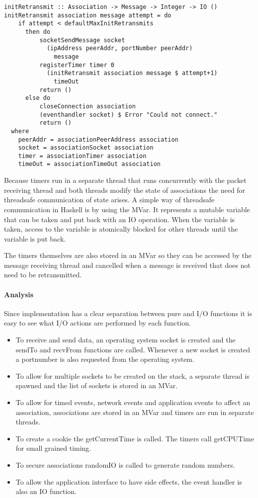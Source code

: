 \begin{lstlisting}[caption={The init retransmission function}, label={lst-retransmission}]
initRetransmit :: Association -> Message -> Integer -> IO ()
initRetransmit association message attempt = do
    if attempt < defaultMaxInitRetransmits
      then do
          socketSendMessage socket 
            (ipAddress peerAddr, portNumber peerAddr)
              message
          registerTimer timer 0
            (initRetransmit association message $ attempt+1)
              timeOut
          return ()
      else do
          closeConnection association
          (eventhandler socket) $ Error "Could not connect."
          return ()
  where
    peerAddr = associationPeerAddress association
    socket = associationSocket association
    timer = associationTimer association
    timeOut = associationTimeOut association
\end{lstlisting}
Because timers run in a separate thread that runs concurrently with the packet receiving thread and both threads modify the state of associations the need for threadsafe communication of state arises. 
A simple way of threadsafe communication in Haskell is by using the MVar.
It represents a mutable variable that can be taken and put back with an IO operation.
When the variable is taken, access to the variable is atomically blocked for other threads until the variable is put back. 

The timers themselves are also stored in an MVar so they can be accessed by the message receiving thread and cancelled when a message is received that does not need to be retransmitted.

\paragraph{Analysis}
Since implementation has a clear separation between pure and I/O functions it is easy to see what I/O actions are performed by each function. 

\begin{itemize}
\item To receive and send data, an operating system socket is created and the sendTo and recvFrom functions are called. Whenever a new socket is created a portnumber is also requested from the operating system.
\item To allow for multiple sockets to be created on the stack, a separate thread is spawned and the list of sockets is stored in an MVar.
\item To allow for timed events, network events and application events to affect an association, associations are stored in an MVar and timers are run in separate threads.
\item To create a cookie the getCurrentTime is called. The timers call getCPUTime for small grained timing.
\item To secure associations randomIO is called to generate random numbers.
\item To allow the application interface to have side effects, the event handler is also an IO function.
\end{itemize}

